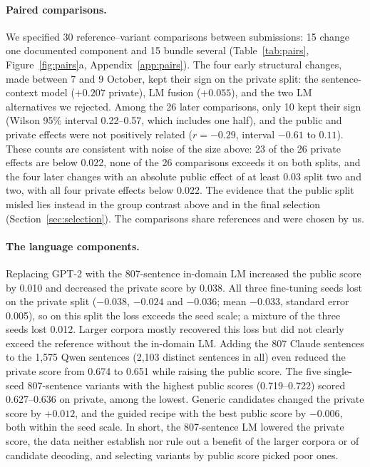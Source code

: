 \documentclass{article}
\begin{document}
\paragraph{Paired comparisons.} We specified 30 reference--variant comparisons between submissions: 15 change one documented component and 15 bundle several (Table~\ref{tab:pairs}, Figure~\ref{fig:pairs}a, Appendix~\ref{app:pairs}). The four early structural changes, made between 7 and 9 October, kept their sign on the private split: the sentence-context model ($+0.207$ private), LM fusion ($+0.055$), and the two LM alternatives we rejected. Among the 26 later comparisons, only 10 kept their sign (Wilson 95\% interval 0.22--0.57, which includes one half), and the public and private effects were not positively related ($r=-0.29$, interval $-0.61$ to $0.11$). These counts are consistent with noise of the size above: 23 of the 26 private effects are below 0.022, none of the 26 comparisons exceeds it on both splits, and the four later changes with an absolute public effect of at least 0.03 split two and two, with all four private effects below 0.022. The evidence that the public split misled lies instead in the group contrast above and in the final selection (Section~\ref{sec:selection}). The comparisons share references and were chosen by us.

\paragraph{The language components.} Replacing GPT-2 with the 807-sentence in-domain LM increased the public score by 0.010 and decreased the private score by 0.038. All three fine-tuning seeds lost on the private split ($-0.038$, $-0.024$ and $-0.036$; mean $-0.033$, standard error 0.005), so on this split the loss exceeds the seed scale; a mixture of the three seeds lost 0.012. Larger corpora mostly recovered this loss but did not clearly exceed the reference without the in-domain LM. Adding the 807 Claude sentences to the 1{,}575 Qwen sentences (2{,}103 distinct sentences in all) even reduced the private score from 0.674 to 0.651 while raising the public score. The five single-seed 807-sentence variants with the highest public scores (0.719--0.722) scored 0.627--0.636 on private, among the lowest. Generic candidates changed the private score by $+0.012$, and the guided recipe with the best public score by $-0.006$, both within the seed scale. In short, the 807-sentence LM lowered the private score, the data neither establish nor rule out a benefit of the larger corpora or of candidate decoding, and selecting variants by public score picked poor ones.
\end{document}
